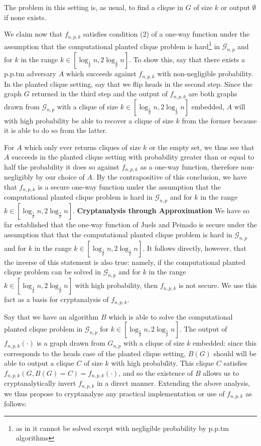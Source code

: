 \documentclass{article}
\theoremstyle{definition}
\begin{document}
\noindent The problem in this setting is, as usual, to find a clique in $G$ of size $k$ 
or output $\emptyset$ if none exists.

We claim now that $f_{n,p,k}$ satisfies condition (2) of a one-way function under the assumption 
that the computational planted clique problem is hard\footnote{as in it cannot be solved except 
with negligible probability by p.p.tm algorithms} in $\mathcal{G}_{n,p}$ and for 
$k$ in the range $k \in [\log_{\frac{1}{p}} n, 2\log_{\frac{1}{p}} n]$.  To show this, 
say that there exists a p.p.tm adversary $A$ which succeeds against $f_{n,p,k}$ with 
non-negligible probability.  In the planted clique setting, say that we flip heads in the 
second step.  Since the graph $G$ returned in the third step and the output of $f_{n,p,k}$ are both graphs drawn from $\mathcal{G}_{n,p}$ with a clique of size 
$k \in [\log_{\frac{1}{p}} n, 2\log_{\frac{1}{p}} n]$ embedded, $A$ will with high probability 
be able to recover a clique of size $k$ from the former because it is able to do so from the latter.

For $A$ which only ever returns cliques of size $k$ or the empty set, we thus see that $A$
succeeds in the planted clique setting with probability greater than or equal to half the probability it does so against $f_{n,p,k}$ as a one-way function, therefore non-negligibly by our 
choice of $A$.  By the contrapositive of this conclusion, we have that $f_{n,p,k}$ is a 
secure one-way function under the assumption that the computational planted clique problem is 
hard in $\mathcal{G}_{n,p}$ and for $k$ in the range $k \in [\log_{\frac{1}{p}} n, 2\log_{\frac{1}{p}} n]$.
\newline\newline
\noindent \textbf{Cryptanalysis through Approximation } We have so far established 
that the one-way function of Juels and Peinado is secure under the assumption that 
that the computational planted clique problem is 
hard in $\mathcal{G}_{n,p}$ and for $k$ in the range 
$k \in [\log_{\frac{1}{p}} n, 2\log_{\frac{1}{p}} n]$.  It follows directly, however,
that the inverse of this statement is also true: namely, if 
the computational planted clique problem can be solved in $\mathcal{G}_{n,p}$ and for 
$k$ in the range $k \in [\log_{\frac{1}{p}} n, 2\log_{\frac{1}{p}} n]$ with high probability, then 
$f_{n,p,k}$ is not secure.  We use this fact as a basis for cryptanalysis of $f_{n,p,k}$.

Say that we have an algorithm $B$ which is able to solve the computational planted clique problem 
in $\mathcal{G}_{n,p}$ for $k \in [\log_{\frac{1}{p}} n, 2\log_{\frac{1}{p}} n]$.  The output of 
$f_{n,p,k}(\cdot)$ is a graph drawn from $G_{n,p}$ with a clique of size $k$ embedded: since this 
corresponds to the heads case of the planted clique setting, $B(G)$ should will be able to 
output a clique $C$ of size $k$ with high probability.  This clique $C$ satisfies $f_{n,p,k}(G,B(G)=C) = f_{n,p,k}(\cdot)$, and so the existence of $B$ allows us to cryptanalytically invert $f_{n,p,k}$ 
in a direct manner.
\newline\newline
Extending the above analysis, we thus propose to cryptanalyze any practical implementation 
or use of $f_{n,p,k}$ as follows:
\end{document}
